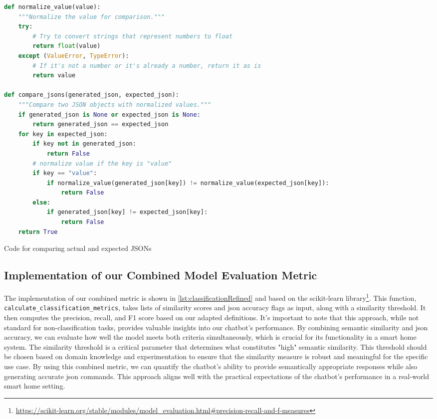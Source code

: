 \begin{Listing}
    \begin{lstlisting}[language=Python]
def normalize_value(value):
    """Normalize the value for comparison."""
    try:
        # Try to convert strings that represent numbers to float
        return float(value)
    except (ValueError, TypeError):
        # If it's not a number or it's already a number, return it as is
        return value

def compare_jsons(generated_json, expected_json):
    """Compare two JSON objects with normalized values."""
    if generated_json is None or expected_json is None:
        return generated_json == expected_json
    for key in expected_json:
        if key not in generated_json:
            return False
        # normalize value if the key is "value"
        if key == "value":
            if normalize_value(generated_json[key]) != normalize_value(expected_json[key]):
                return False
        else:
            if generated_json[key] != expected_json[key]:
                return False
    return True
    \end{lstlisting}
    \caption{Code for comparing actual and expected JSONs}
    \label{lst:compare-json}   
\end{Listing}



\subsection{Implementation of our Combined Model Evaluation Metric}
\label{sec:impl-combinedeval}
The implementation of our combined metric is shown in \cref{lst:classificationRefined} and based on the scikit-learn library\footnote{\url{https://scikit-learn.org/stable/modules/model\_evaluation.html\#precision-recall-and-f-measures}}. This function, \texttt{calculate\_classification\_metrics}, takes lists of similarity scores and \gls{json} accuracy flags as input, along with a similarity threshold. It then computes the precision, recall, and F1 score based on our adapted definitions.
It's important to note that this approach, while not standard for non-classification tasks, provides valuable insights into our chatbot's performance. By combining semantic similarity and \gls{json} accuracy, we can evaluate how well the model meets both criteria simultaneously, which is crucial for its functionality in a smart home system.
The similarity threshold is a critical parameter that determines what constitutes "high" semantic similarity. This threshold should be chosen based on domain knowledge and experimentation to ensure that the similarity measure is robust and meaningful for the specific use case.
By using this combined metric, we can quantify the chatbot's ability to provide semantically appropriate responses while also generating accurate \gls{json} commands. This approach aligns well with the practical expectations of the chatbot's performance in a real-world smart home setting.

